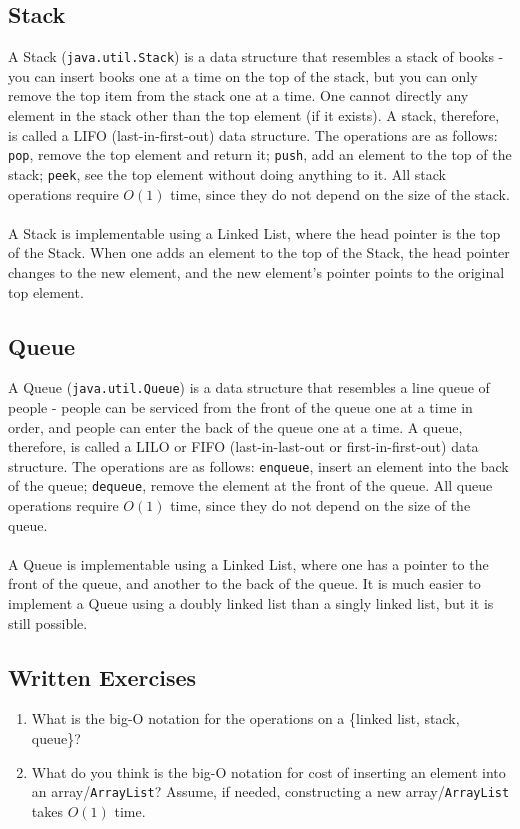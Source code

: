 \subsection{Stack}
A Stack (\verb|java.util.Stack|) is a data structure that resembles a stack of books - you can insert books one at a time on the top of the stack, but you can only remove the top item from the stack one at a time. One cannot directly any element in the stack other than the top element (if it exists). A stack, therefore, is called a LIFO (last-in-first-out) data structure. The operations are as follows: \verb|pop|, remove the top element and return it; \verb|push|, add an element to the top of the stack; \verb|peek|, see the top element without doing anything to it. All stack operations require $O(1)$ time, since they do not depend on the size of the stack.
\\ \\
A Stack is implementable using a Linked List, where the head pointer is the top of the Stack. When one adds an element to the top of the Stack, the head pointer changes to the new element, and the new element's pointer points to the original top element.

\subsection{Queue}
A Queue (\verb|java.util.Queue|) is a data structure that resembles a line queue of people - people can be serviced from the front of the queue one at a time in order, and people can enter the back of the queue one at a time. A queue, therefore, is called a LILO or FIFO (last-in-last-out or first-in-first-out) data structure. The operations are as follows: \verb|enqueue|, insert an element into the back of the queue; \verb|dequeue|, remove the element at the front of the queue. All queue operations require $O(1)$ time, since they do not depend on the size of the queue.
\\ \\
A Queue is implementable using a Linked List, where one has a pointer to the front of the queue, and another to the back of the queue. It is much easier to implement a Queue using a doubly linked list than a singly linked list, but it is still possible.

\subsection{Written Exercises}
\setcounter{counter}{1}
\begin{enumerate}[label={\arabic{counter}\addtocounter{counter}{1}}.]
\item What is the big-O notation for the operations on a \{linked list, stack, queue\}?
\item What do you think is the big-O notation for cost of inserting an element into an array/\verb|ArrayList|? Assume, if needed, constructing a new array/\verb|ArrayList| takes $O(1)$ time.
\end{enumerate}